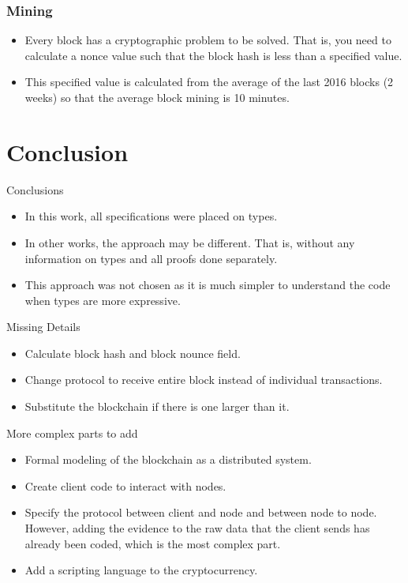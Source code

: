 \documentclass{beamer}
\begin{document}
\begin{frame}
   \frametitle{Mining}
   \begin{itemize}[<+->]
     \item Every block has a cryptographic problem to be solved. That is,
       you need to calculate a nonce value such that the block hash is less than a specified value.
     \item This specified value is calculated from the average of the last 2016 blocks (2 weeks)
       so that the average block mining is 10 minutes.
   \end{itemize}
\end{frame}

\section{Conclusion}

\begin{frame}{Conclusions}
  \begin{itemize}[<+->]
    \item In this work, all specifications were placed on types.
    \item In other works, the approach may be different.
      That is, without any information on types and all proofs done separately.
    \item This approach was not chosen as it is much simpler to understand the code when types are more expressive.
  \end{itemize}
\end{frame}

\begin{frame}{Missing Details}
  \begin{itemize}[<+->]
    \item Calculate block hash and block nounce field.
    \item Change protocol to receive entire block instead of individual transactions.
    \item Substitute the blockchain if there is one larger than it.
  \end{itemize}
\end{frame}

\begin{frame}{More complex parts to add}
  \begin{itemize}[<+->]
    \item Formal modeling of the blockchain as a distributed system.
    \item Create client code to interact with nodes.
    \item Specify the protocol between client and node and between node to node.
          However, adding the evidence to the raw data that the client sends has already been coded,
          which is the most complex part.
    \item Add a scripting language to the cryptocurrency.
  \end{itemize}
\end{frame}
\end{document}
